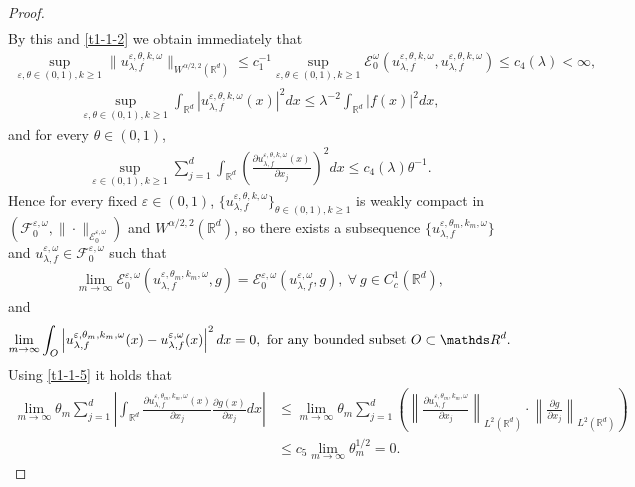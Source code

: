 \documentclass[11pt,draft, reqno]{amsart}
\renewcommand{\le}{\leqslant}
\renewcommand{\ge}{\geqslant}
\def\EE{{\mathcal E}}
\def\FF{{\mathcal F}}
\newcommand{\R}{\mathds R}
\newcommand{\e}{\varepsilon}
\newcommand{\w}{\omega}
\theoremstyle{definition}
\numberwithin{equation}{section}
\begin{document}
\begin{proof}
\begin{align*}
\end{align*}
By this and \eqref{t1-1-2} we obtain immediately that
\begin{align}\label{t1-1-6a}
\sup_{\e,\theta\in (0,1),k\ge 1}\|u_{\lambda,f}^{\e,\theta,k,\w}\|_{W^{\alpha/2,2}(\R^d)}\le c_1^{-1}\sup_{\e,\theta\in (0,1),k\ge 1}\EE^\w_0(u_{\lambda,f}^{\e,\theta,k,\w},u_{\lambda,f}^{\e,\theta,k,\w})\le c_4(\lambda)<\infty,
\end{align}
\begin{align}\label{t1-1-8}
\sup_{\e,\theta\in (0,1),k\ge 1}\int_{\R^d}|u_{\lambda,f}^{\e,\theta,k,\w}(x)|^2dx\le \lambda^{-2}\int_{\R^d}|f(x)|^2dx,
\end{align}
and for every $\theta\in (0,1)$,
\begin{align}\label{t1-1-5}
\sup_{\e\in (0,1),k\ge 1}\sum_{j=1}^d\int_{\R^d}
\left(\frac{\partial u_{\lambda,f}^{\e,\theta,k,\w}(x)}{\partial x_j}\right)^2dx\le c_4(\lambda)\theta^{-1}.
\end{align}
Hence for every fixed $\e\in (0,1)$, $\{u_{\lambda,f}^{\e,\theta,k,\w}\}_{\theta\in (0,1),k\ge 1}$ is weakly compact in $\left(\FF^{\e,\w}_0,\|\cdot\|_{\EE^{\e,\w}_0}\right)$ and
$W^{\alpha/2,2}(\R^d)$, so there exists a subsequence $\{u_{\lambda,f}^{\e,\theta_m,k_m,\w}\}$ and $u_{\lambda,f}^{\e,\w}\in \FF^{\e,\w}_0$ such that
\begin{align*}
\lim_{m \to \infty}\EE^{\e,\w}_0(u_{\lambda,f}^{\e,\theta_m,k_m,\w},g)=\EE^{\e,\w}_0(u_{\lambda,f}^{\e,\w},g),\ \forall\ g\in C_c^1(\R^d),
\end{align*}
and
\begin{equation}\label{t1-1-5a}
\lim_{m \to \infty}\int_{O}\left|u_{\lambda,f}^{\e,\theta_m,k_m,\w}(x)-u_{\lambda,f}^{\e,\w}(x)\right|^2dx=0,\ {\rm for\ any\ bounded\ subset}\ O\subset \R^d.
\end{equation}
Using \eqref{t1-1-5} it holds that
\begin{align*}
\lim_{m \to \infty}\theta_m\sum_{j=1}^d\left|\int_{\R^d}\frac{\partial u_{\lambda,f}^{\e,\theta_m,k_m,\w}(x)}{\partial x_j}\frac{\partial g(x)}{\partial x_j}dx\right|
&\le \lim_{m \to \infty}\theta_m\sum_{j=1}^d \left(\left\|\frac{\partial u_{\lambda,f}^{\e,\theta_m,k_m,\w}}{\partial x_j}\right\|_{L^2(\R^d)}\cdot
\left\|\frac{\partial g}{\partial x_j}\right\|_{L^2(\R^d)}\right)\\
&\le c_5\lim_{m \to \infty}\theta_m^{1/2}=0.

\end{align*}
\end{proof}
\end{document}
